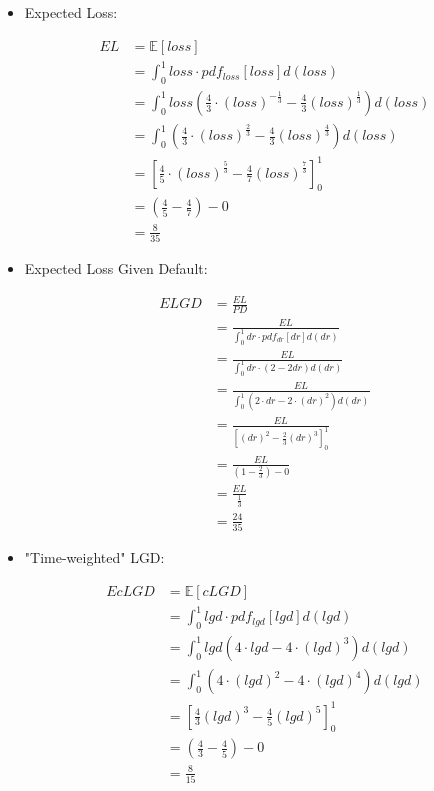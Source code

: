 \documentclass[11pt]{article}
\newcommand{\Exp}{\mathbb{E}}
\begin{document}
\begin{itemize}
\item Expected Loss:

$$
\begin{aligned}
EL &= \Exp[loss] \\
&= \int_0^1 loss \cdot pdf_{loss}[loss] d(loss) \\
&= \int_0^1 loss 
\left( 
\frac{4}{3} \cdot (loss)^{-\frac{1}{3}} 
-\frac{4}{3} (loss)^{\frac{1}{3}}
\right) d(loss) \\
&= \int_0^1 \left( 
\frac{4}{3} \cdot (loss)^{\frac{2}{3}} 
-\frac{4}{3} (loss)^{\frac{4}{3}}
\right) d(loss) \\
&= \left[
\frac{4}{5} \cdot (loss)^{\frac{5}{3}} 
-\frac{4}{7} (loss)^{\frac{7}{3}}
\right]_0^1 \\
&= \left(\frac{4}{5} - \frac{4}{7} \right) - 0 \\
&= \frac{8}{35}
\end{aligned}
$$

\newpage

\item Expected Loss Given Default:

$$
\begin{aligned}
ELGD &= \frac{EL}{PD} \\
&= \frac{EL}{\int_0^1 dr \cdot pdf_{dr}[dr] d(dr)} \\
&= \frac{EL}{\int_0^1 dr \cdot (2 - 2dr) d(dr)} \\
&= \frac{EL}{\int_0^1 
\left(
2 \cdot dr - 2 \cdot (dr)^2 
\right) d(dr)} \\
&= \frac{EL}{
\left[
(dr)^2 - \frac{2}{3} (dr)^3
\right]_0^1} \\
&= \frac{EL}{
\left( 1 - \frac{2}{3} \right) - 0} \\
&= \frac{EL}{\frac{1}{3}} \\
&= \frac{24}{35}
\end{aligned}
$$


\item "Time-weighted" LGD:

$$
\begin{aligned}
EcLGD &= \Exp[cLGD] \\ 
&= \int_0^1 lgd \cdot pdf_{lgd}[lgd] d(lgd) \\
&= \int_0^1 lgd
\left(
4 \cdot lgd - 4 \cdot (lgd)^3
\right) d(lgd) \\
&= \int_0^1
\left(
4 \cdot (lgd)^2 - 4 \cdot (lgd)^4
\right) d(lgd) \\
&= \left[
\frac{4}{3} (lgd)^3 - \frac{4}{5} (lgd)^5
\right]_0^1 \\
&= \left(\frac{4}{3} - \frac{4}{5} \right) - 0 \\
&= \frac{8}{15}
\end{aligned}
$$

\end{itemize}
\end{document}
